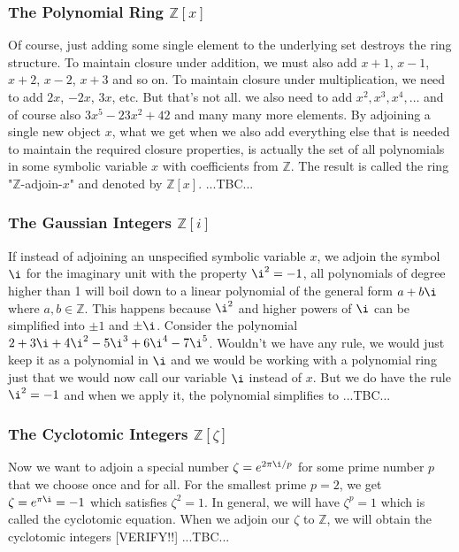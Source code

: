 \subsubsection{The Polynomial Ring $\mathbb{Z}[x]$}
Of course, just adding some single element to the underlying set destroys the ring structure. To maintain closure under addition, we must also add $x+1$, $x-1$, $x+2$, $x-2$, $x+3$ and so on. To maintain closure under multiplication, we need to add $2 x$, $-2 x$, $3 x$, etc. But that's not all. we also need to add $x^2, x^3, x^4, \ldots$ and of course also $3 x^5 - 23 x^2 + 42$ and many many more elements. By adjoining a single new object $x$, what we get when we also add everything else that is needed to maintain the required closure properties, is actually the set of all polynomials in some symbolic variable $x$ with coefficients from $\mathbb{Z}$. The result is called the ring "$\mathbb{Z}$-adjoin-$x$" and denoted by $\mathbb{Z}[x]$. ...TBC...

\subsubsection{The Gaussian Integers $\mathbb{Z}[i]$}
If instead of adjoining an unspecified symbolic variable $x$, we adjoin the symbol $\i$ for the imaginary unit with the property $\i^2 = -1$, all polynomials of degree higher than 1 will boil down to a linear polynomial of the general form $a + b \i$ where $a,b \in \mathbb{Z}$. This happens because $\i^2$ and higher powers of $\i$ can be simplified into $\pm 1$ and $\pm \i$. Consider the polynomial $2 + 3 \i + 4 \i^2 - 5 \i^3 + 6 \i^4 - 7 \i^5$. Wouldn't we have any rule, we would just keep it as a polynomial in $\i$ and we would be working with a polynomial ring just that we would now call our variable $\i$ instead of $x$. But we do have the rule $\i^2 = -1$ and when we apply it, the polynomial simplifies to ...TBC...

\subsubsection{The Cyclotomic Integers $\mathbb{Z}[\zeta]$}
Now we want to adjoin a special number $\zeta = e^{2 \pi \i / p}$ for some prime number $p$ that we choose once and for all. For the smallest prime $p=2$, we get $\zeta = e^{\pi \i} = -1$ which satisfies $\zeta^2 = 1$. In general, we will have $\zeta^p = 1$ which is called the cyclotomic equation. When we adjoin our $\zeta$ to $\mathbb{Z}$, we will obtain the cyclotomic integers [VERIFY!!] ...TBC...

